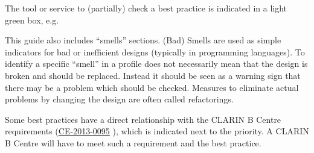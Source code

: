 
The tool or service to (partially) check a best practice is indicated in a light green box, e.g.

This guide also includes ``smells'' sections. (Bad) Smells are used as simple indicators for bad or inefficient designs (typically in programming languages). To identify a specific ``smell'' in a profile does not necessarily mean that the design is broken and should be replaced. Instead it should be seen as a warning sign that there may be a problem which should be checked. Measures to eliminate actual problems by changing the design are often called refactorings. 

Some best practices have a direct relationship with the CLARIN B Centre requirements (\href{http://hdl.handle.net/11372/DOC-78}{CE-2013-0095} \cite{ce20130095}),
which is indicated next to the priority. A CLARIN B Centre will have to meet such a requirement and the best practice.

